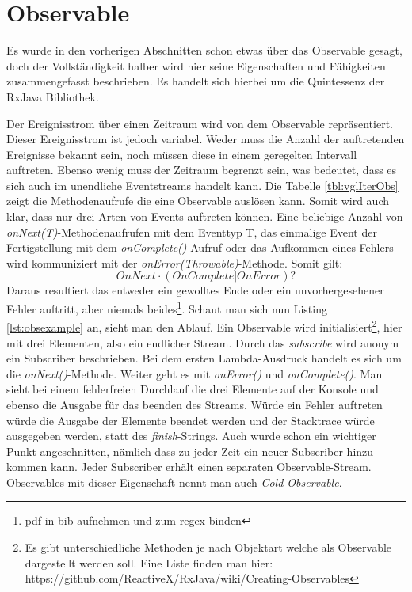 \section{Observable}
Es wurde in den vorherigen Abschnitten schon etwas über das Observable gesagt, doch der Vollständigkeit halber wird hier seine Eigenschaften und Fähigkeiten zusammengefasst beschrieben. Es handelt sich hierbei um die Quintessenz der RxJava Bibliothek.

Der Ereignisstrom über einen Zeitraum wird von dem Observable repräsentiert. Dieser Ereignisstrom ist jedoch variabel. Weder muss die Anzahl der auftretenden Ereignisse bekannt sein, noch müssen diese in einem geregelten Intervall auftreten. Ebenso wenig muss der Zeitraum begrenzt sein, was bedeutet, dass es sich auch im unendliche Eventstreams handelt kann. Die Tabelle \ref{tbl:vglIterObs} zeigt die Methodenaufrufe die eine Observable auslösen kann. Somit wird auch klar, dass nur drei Arten von Events auftreten können. Eine beliebige Anzahl von \textit{onNext(T)}-Methodenaufrufen mit dem Eventtyp T, das einmalige Event der Fertigstellung mit dem \textit{onComplete()}-Aufruf oder das Aufkommen eines Fehlers wird kommuniziert mit der \textit{onError(Throwable)}-Methode. Somit gilt: 
\begin{displaymath}
	OnNext\cdot(OnComplete | OnError)?
\end{displaymath}
Daraus resultiert das entweder ein gewolltes Ende oder ein unvorhergesehener Fehler auftritt, aber niemals beides\footnote{pdf in bib aufnehmen und zum regex binden}. Schaut man sich nun Listing \ref{lst:obsexample} an, sieht man den Ablauf. Ein Observable wird initialisiert\footnote{Es gibt unterschiedliche Methoden je nach Objektart welche als Observable dargestellt werden soll. Eine Liste finden man hier: https://github.com/ReactiveX/RxJava/wiki/Creating-Observables}, hier mit drei Elementen, also ein endlicher Stream. Durch das \textit{subscribe} wird anonym ein Subscriber beschrieben. Bei dem ersten Lambda-Ausdruck handelt es sich um die \textit{onNext()}-Methode. Weiter geht es mit \textit{onError()} und \textit{onComplete()}. Man sieht bei einem fehlerfreien Durchlauf die drei Elemente auf der Konsole und ebenso die Ausgabe für das beenden des Streams. Würde ein Fehler auftreten würde die Ausgabe der Elemente beendet werden und der Stacktrace würde ausgegeben werden, statt des \textit{finish}-Strings. Auch wurde schon ein wichtiger Punkt angeschnitten, nämlich dass zu jeder Zeit ein neuer Subscriber hinzu kommen kann. Jeder Subscriber erhält einen separaten Observable-Stream. Observables mit dieser Eigenschaft nennt man auch \textit{Cold Observable}.
